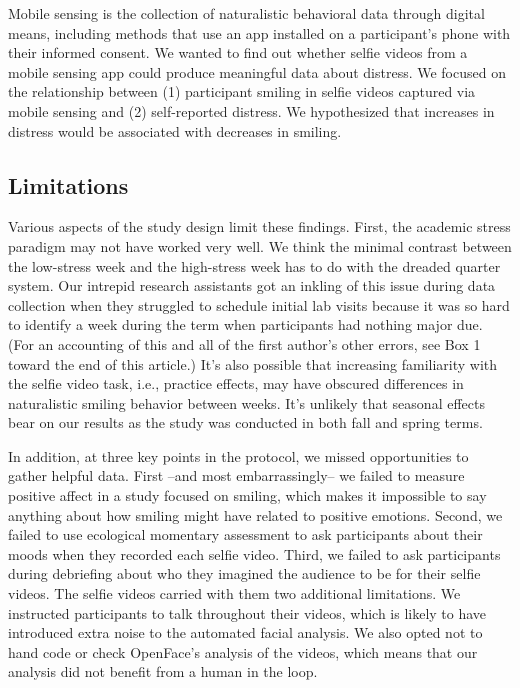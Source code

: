 \documentclass[authordate, empirical,issue]{jote-new-article}
\begin{document}
\begin{originalPurpose}



  Mobile sensing is the collection of naturalistic behavioral data through digital means, including methods that use an app installed on a participant's phone with their informed consent. We wanted to find out whether selfie videos from a mobile sensing app could produce meaningful data about distress. We focused on the relationship between (1) participant smiling in selfie videos captured via mobile sensing and (2) self-reported distress. We hypothesized that increases in distress would be associated with decreases in smiling.

\end{originalPurpose}




\subsection{Limitations}



Various aspects of the study design limit these findings. First, the academic stress paradigm may not have worked very well. We think the minimal contrast between the low-stress week and the high-stress week has to do with the dreaded quarter system. Our intrepid research assistants got an inkling of this issue during data collection when they struggled to schedule initial lab visits because it was so hard to identify a week during the term when participants had nothing major due. (For an accounting of this and all of the first author's other errors, see Box 1 toward the end of this article.) It's also possible that increasing familiarity with the selfie video task, i.e., practice effects, may have obscured differences in naturalistic smiling behavior between weeks. It's unlikely that seasonal effects bear on our results as the study was conducted in both fall and spring terms.



In addition, at three key points in the protocol, we missed opportunities to gather helpful data. First --and most embarrassingly-- we failed to measure positive affect in a study focused on smiling, which makes it impossible to say anything about how smiling might have related to positive emotions. Second, we failed to use ecological momentary assessment to ask participants about their moods when they recorded each selfie video. Third, we failed to ask participants during debriefing about who they imagined the audience to be for their selfie videos. The selfie videos carried with them two additional limitations. We instructed participants to talk throughout their videos, which is likely to have introduced extra noise to the automated facial analysis. We also opted not to hand code or check OpenFace's analysis of the videos, which means that our analysis did not benefit from a human in the loop.
\end{document}
